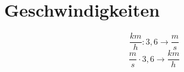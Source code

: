 \section{Geschwindigkeiten}
\label{sec:Geschwindigkeiten}
\[
{
\frac{km}{h}
: 3,6\rightarrow
\frac{m}{s}
}
\]
\[
{
\frac{m}{s}
\cdot 3,6\rightarrow
\frac{km}{h}
}
\]

